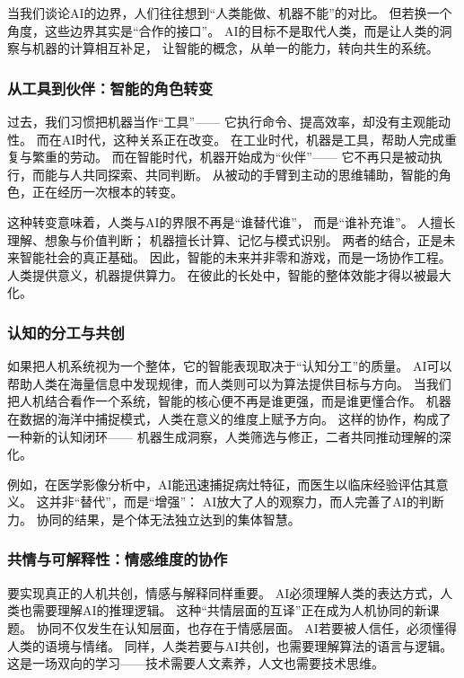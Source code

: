 当我们谈论AI的边界，人们往往想到“人类能做、机器不能”的对比。  
但若换一个角度，这些边界其实是“合作的接口”。  
AI的目标不是取代人类，而是让人类的洞察与机器的计算相互补足，  
让智能的概念，从单一的能力，转向共生的系统。

\subsubsection{从工具到伙伴：智能的角色转变}

过去，我们习惯把机器当作“工具”——  
它执行命令、提高效率，却没有主观能动性。  
而在AI时代，这种关系正在改变。  
在工业时代，机器是工具，帮助人完成重复与繁重的劳动。  
而在智能时代，机器开始成为“伙伴”——  
它不再只是被动执行，而能与人共同探索、共同判断。  
从被动的手臂到主动的思维辅助，智能的角色，正在经历一次根本的转变。

这种转变意味着，人类与AI的界限不再是“谁替代谁”，  
而是“谁补充谁”。  
人擅长理解、想象与价值判断；  
机器擅长计算、记忆与模式识别。  
两者的结合，正是未来智能社会的真正基础。  
因此，智能的未来并非零和游戏，而是一场协作工程。  
人类提供意义，机器提供算力。  
在彼此的长处中，智能的整体效能才得以被最大化。

\subsubsection{认知的分工与共创}

如果把人机系统视为一个整体，它的智能表现取决于“认知分工”的质量。  
AI可以帮助人类在海量信息中发现规律，而人类则可以为算法提供目标与方向。  
当我们把人机结合看作一个系统，智能的核心便不再是谁更强，而是谁更懂合作。  
机器在数据的海洋中捕捉模式，人类在意义的维度上赋予方向。  
这样的协作，构成了一种新的认知闭环——  
机器生成洞察，人类筛选与修正，二者共同推动理解的深化。

例如，在医学影像分析中，AI能迅速捕捉病灶特征，而医生以临床经验评估其意义。  
这并非“替代”，而是“增强”：  
AI放大了人的观察力，而人完善了AI的判断力。  
协同的结果，是个体无法独立达到的集体智慧。

\subsubsection{共情与可解释性：情感维度的协作}

要实现真正的人机共创，情感与解释同样重要。  
AI必须理解人类的表达方式，人类也需要理解AI的推理逻辑。  
这种“共情层面的互译”正在成为人机协同的新课题。  
协同不仅发生在认知层面，也存在于情感层面。  
AI若要被人信任，必须懂得人类的语境与情绪。  
同样，人类若要与AI共创，也需要理解算法的语言与逻辑。  
这是一场双向的学习——技术需要人文素养，人文也需要技术思维。

